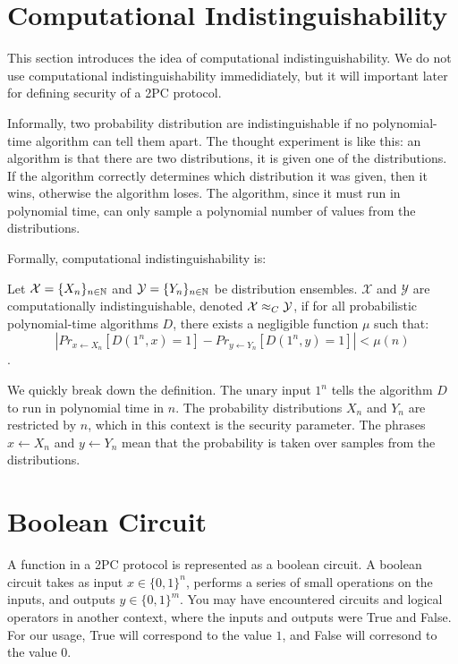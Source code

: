 \section{Computational Indistinguishability}
This section introduces the idea of computational indistinguishability. 
We do not use computational indistinguishability immedidiately, but it will important later for defining security of a 2PC protocol.

Informally, two probability distribution are indistinguishable if no polynomial-time algorithm can tell them apart.
The thought experiment is like this: an algorithm is  that there are two distributions, it is given one of the distributions.
If the algorithm correctly determines which distribution it was given, then it wins, otherwise the algorithm loses.
The algorithm, since it must run in polynomial time, can only sample a polynomial number of values from the distributions.

Formally, computational indistinguishability is:

\begin{definition}
\label{defn:computational-indistinguishability}
Let $\mathcal{X} = \{X_n\}_{n \in \mathbb{N}}$ and $\mathcal{Y} = \{Y_n\}_{n \in \mathbb{N}}$ be distribution ensembles.
$\mathcal{X}$ and $\mathcal{Y}$ are computationally indistinguishable, denoted $\mathcal{X} \approx_C \mathcal{Y}$, if for all probabilistic polynomial-time algorithms $D$, there exists a negligible function $\mu$ such that:
\begin{equation}
    |Pr_{x \gets X_n} [D(1^n, x) = 1] - Pr_{y \gets Y_n} [D(1^n, y) = 1]| < \mu(n)
\end{equation}
\cite{katzlindelltextbook}.
\end{definition}

We quickly break down the definition.
The unary input $1^n$ tells the algorithm $D$ to run in polynomial time in $n$.
The probability distributions $X_n$ and $Y_n$ are restricted by $n$, which in this context is the security parameter.
The phrases $x \gets X_n$ and $y \gets Y_n$ mean that the probability is taken over samples from the distributions.

\section{Boolean Circuit} 
A function in a 2PC protocol is represented as a boolean circuit.
A boolean circuit takes as input $x \in \{0,1\}^n$, performs a series of small operations on the inputs, and outputs $y \in \{0,1\}^m$.  
You may have encountered circuits and logical operators in another context, where the inputs and outputs were True and False.
For our usage, True will correspond to the value $1$, and False will corresond to the value $0$. 

